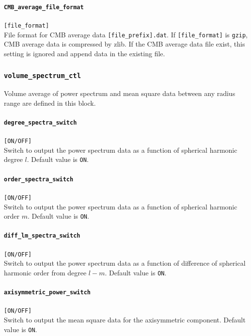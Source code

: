 \paragraph{\tt CMB\_average\_file\_format}
\label{href_t:CMB_average_file_format}
\verb|[file_format]| \\
File format for CMB average data \verb|[file_prefix].dat|. If \verb|[file_format]| is \verb|gzip|,  CMB average data is compressed by zlib.  If the  CMB average data file exist, this setting is ignored and append data in the existing file.

%
\subsubsection{\tt volume\_spectrum\_ctl}
\label{href_t:volume_spectrum_ctl}
Volume average of power spectrum and mean square data between any radius range are defined in this block.

\paragraph{\tt degree\_spectra\_switch}
\label{href_t:degree_spectra_switch}
\verb|[ON/OFF]| \\
Switch to output the power spectrum data as a function of spherical harmonic degree $l$. Default value is {\tt ON}.

\paragraph{\tt order\_spectra\_switch}
\label{href_t:order_spectra_switch}
\verb|[ON/OFF]| \\
Switch to output the power spectrum data as a function of spherical harmonic order $m$. Default value is {\tt ON}.

\paragraph{\tt diff\_lm\_spectra\_switch}
\label{href_t:diff_lm_spectra_switch}
\verb|[ON/OFF]| \\
Switch to output the power spectrum data as a function of difference of spherical harmonic order from degree $l-m$. Default value is {\tt ON}.

\paragraph{\tt axisymmetric\_power\_switch}
\label{href_t:axisymmetric_power_switch}
\verb|[ON/OFF]| \\
Switch to output the mean square data for the axisymmetric component. Default value is {\tt ON}.

